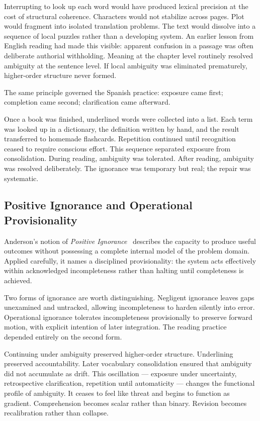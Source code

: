 \documentclass[11pt]{article}
\theoremstyle{remark}
\begin{document}
Interrupting to look up each word would have produced lexical precision at the cost of structural coherence. Characters would not stabilize across pages. Plot would fragment into isolated translation problems. The text would dissolve into a sequence of local puzzles rather than a developing system. An earlier lesson from English reading had made this visible: apparent confusion in a passage was often deliberate authorial withholding. Meaning at the chapter level routinely resolved ambiguity at the sentence level. If local ambiguity was eliminated prematurely, higher-order structure never formed.

The same principle governed the Spanish practice: exposure came first; completion came second; clarification came afterward.

Once a book was finished, underlined words were collected into a list. Each term was looked up in a dictionary, the definition written by hand, and the result transferred to homemade flashcards. Repetition continued until recognition ceased to require conscious effort. This sequence separated exposure from consolidation. During reading, ambiguity was tolerated. After reading, ambiguity was resolved deliberately. The ignorance was temporary but real; the repair was systematic.

\subsection{Positive Ignorance and Operational Provisionality}

Anderson's notion of \emph{Positive Ignorance}~\cite{anderson} describes the capacity to produce useful outcomes without possessing a complete internal model of the problem domain. Applied carefully, it names a disciplined provisionality: the system acts effectively within acknowledged incompleteness rather than halting until completeness is achieved.

Two forms of ignorance are worth distinguishing. Negligent ignorance leaves gaps unexamined and untracked, allowing incompleteness to harden silently into error. Operational ignorance tolerates incompleteness provisionally to preserve forward motion, with explicit intention of later integration. The reading practice depended entirely on the second form.

Continuing under ambiguity preserved higher-order structure. Underlining preserved accountability. Later vocabulary consolidation ensured that ambiguity did not accumulate as drift. This oscillation — exposure under uncertainty, retrospective clarification, repetition until automaticity — changes the functional profile of ambiguity. It ceases to feel like threat and begins to function as gradient. Comprehension becomes scalar rather than binary. Revision becomes recalibration rather than collapse.
\end{document}
